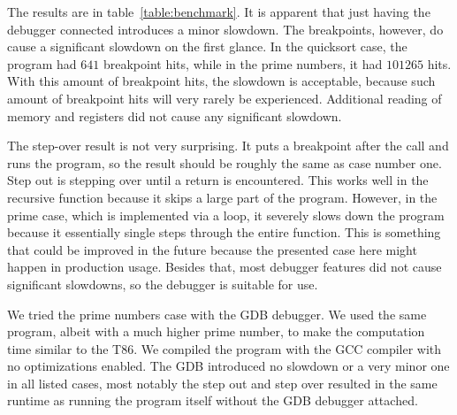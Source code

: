 The results are in table~\ref{table:benchmark}. It is apparent that just having
the debugger connected introduces a minor slowdown. The breakpoints, however,
do cause a significant slowdown on the first glance. In the quicksort case, the
program had $641$ breakpoint hits, while in the prime numbers, it had $101265$
hits. With this amount of breakpoint hits, the slowdown is acceptable, because
such amount of breakpoint hits will very rarely be experienced. Additional
reading of memory and registers did not cause any significant slowdown.

The step-over result is not very surprising. It puts a breakpoint after the
call and runs the program, so the result should be roughly the same as case
number one. Step out is stepping over until a return is encountered. This works
well in the recursive function because it skips a large part of the program.
However, in the prime case, which is implemented via a loop, it severely slows
down the program because it essentially single steps through the entire
function. This is something that could be improved in the future because the
presented case here might happen in production usage. Besides that, most
debugger features did not cause significant slowdowns, so the debugger is
suitable for use.

We tried the prime numbers case with the GDB debugger. We used the same
program, albeit with a much higher prime number, to make the computation time
similar to the T86. We compiled the program with the GCC compiler with no
optimizations enabled. The GDB introduced no slowdown or a very minor one in
all listed cases, most notably the step out and step over resulted in the same
runtime as running the program itself without the GDB debugger attached.
